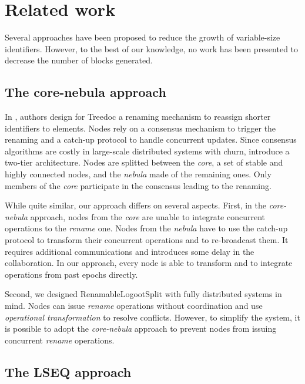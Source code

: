 \documentclass[sigplan,10pt,authorversion]{acmart}
\begin{document}
\section{Related work}

\label{sec:related-work}

Several approaches have been proposed to reduce the growth of variable-size identifiers.
However, to the best of our knowledge, no work has been presented to decrease the number of blocks generated.

\subsection{The core-nebula approach}

In \cite{letia:hal-01248270,zawirski:hal-01248197}, authors design for Treedoc \cite{5158449} a renaming mechanism to reassign shorter identifiers to elements.
Nodes rely on a consensus mechanism to trigger the renaming and a catch-up protocol to handle concurrent updates.
Since consensus algorithms are costly in large-scale distributed systems with churn, \citet{letia:hal-01248270} introduce a two-tier architecture.
Nodes are splitted between the \emph{core}, a set of stable and highly connected nodes, and the \emph{nebula} made of the remaining ones.
Only members of the \emph{core} participate in the consensus leading to the renaming.

While quite similar, our approach differs on several aspects.
First, in the \emph{core-nebula} approach, nodes from the \emph{core} are unable to integrate concurrent operations to the \emph{rename} one.
Nodes from the \emph{nebula} have to use the catch-up protocol to transform their concurrent operations and to re-broadcast them.
It requires additional communications and introduces some delay in the collaboration.
In our approach, every node is able to transform and to integrate operations from past epochs directly.

Second, we designed RenamableLogootSplit with fully distributed systems in mind.
Nodes can issue \emph{rename} operations without coordination and use \emph{operational transformation} to resolve conflicts.
However, to simplify the system, it is possible to adopt the \emph{core-nebula} approach to prevent nodes from issuing concurrent \emph{rename} operations.

\subsection{The LSEQ approach}
\end{document}
